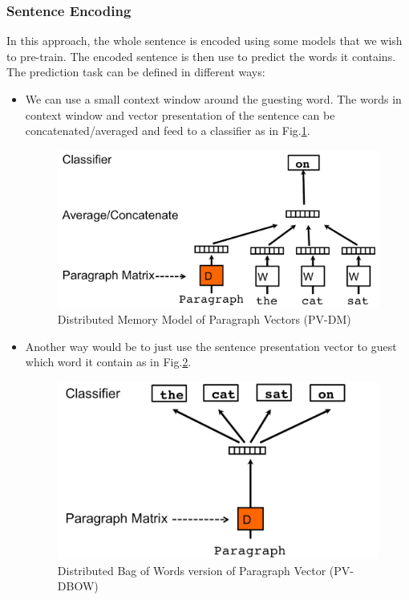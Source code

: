 \subsubsection{Sentence Encoding}
In this approach, the whole sentence is encoded using some models that we wish to pre-train. 
The encoded sentence is then use to predict the words it contains.  
The prediction task can be defined in different ways:
\begin{itemize}
\item We can use a small context window around the guesting word.
The words in context window and vector presentation of the sentence can be concatenated/averaged and feed to a classifier as in Fig.\ref{fig:para-vec-1}.

\begin{figure}[H]
	\centering	\includegraphics[scale=0.3]{figure/para-vec-1}
	\caption{Distributed Memory Model of Paragraph Vectors (PV-DM)\cite{ParagraphVec}}
	\label{fig:para-vec-1}
\end{figure}

\item Another way would be to just use the sentence presentation vector to guest which word it contain as in Fig.\ref{fig:para-vec-2}.

\begin{figure}[H]
	\centering	\includegraphics[scale=0.3]{figure/para-vec-2}
	\caption{Distributed Bag of Words version of Paragraph Vector (PV-DBOW)\cite{ParagraphVec}}
	\label{fig:para-vec-2}
\end{figure}


\end{itemize}
